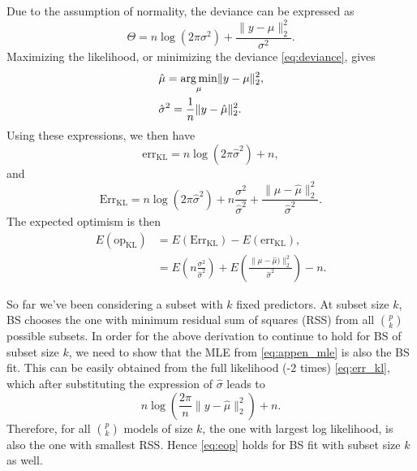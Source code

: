 Due to the assumption of normality, the deviance can be expressed as
\begin{equation}
\Theta = n\log(2\pi \sigma^2) + \frac{\lVert y- \mu \rVert_2^2}{\sigma^2}.
\label{eq:deviance}
\end{equation}
Maximizing the likelihood, or minimizing the deviance \eqref{eq:deviance}, gives
\begin{equation}
\begin{aligned}
& \hat{\mu} = \operatorname*{arg\,min}_\mu  \lVert y-\mu \rVert_2^2,\\
&\hat{\sigma}^2 = \frac{1}{n} \lVert y-\hat{\mu}\rVert_2^2.
\label{eq:appen_mle}
\end{aligned}
\end{equation}
Using these expressions, we then have
\begin{equation}
\text{err}_\text{KL} = n \log(2\pi \hat{\sigma}^2) +n,
\label{eq:err_kl}
\end{equation}
and
\begin{equation*}
\text{Err}_\text{KL} = n\log(2\pi \hat{\sigma}^2) + n\frac{\sigma^2}{\hat{\sigma}^2} +\frac{\lVert \mu- \hat{\mu} \rVert_2^2}{\hat{\sigma}^2}.
\end{equation*}
The expected optimism is then
\begin{equation}
\begin{aligned}
E(\text{op}_\text{KL})  &= E(\text{Err}_\text{KL}) - E(\text{err}_\text{KL}),\\
&= E\left(n\frac{\sigma^2}{\hat{\sigma}^2}\right) + E\left(\frac{\lVert \mu- \hat{\mu}) \rVert_2^2}{\hat{\sigma}^2}\right) -n.
\end{aligned}
\label{eq:eop}
\end{equation}

So far we've been considering a subset with $k$ fixed predictors. At subset size $k$, BS chooses the one with minimum residual sum of squares (RSS) from all $\binom{p}{k}$ possible subsets. In order for the above derivation to continue to hold for BS of subset size $k$, we need to show that the MLE from \eqref{eq:appen_mle} is also the BS fit. This can be easily obtained from the full likelihood (-2 times) \eqref{eq:err_kl}, which after substituting the expression of $\hat{\sigma}$ leads to
\begin{equation*}
n\log\left(\frac{2\pi}{n}\lVert y-\hat{\mu}\rVert_2^2\right) + n.
\end{equation*}
Therefore, for all $\binom{p}{k}$ models of size $k$, the one with largest log likelihood, is also the one with smallest RSS. Hence \eqref{eq:eop} holds for BS fit with subset size $k$ as well.

